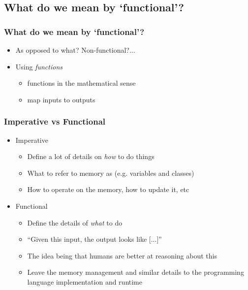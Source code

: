 \documentclass{beamer}
\begin{document}
  \subsection{What do we mean by `functional'?}
  \begin{frame}
    \frametitle{What do we mean by `functional'?}
    \begin{itemize}
      \item As opposed to what? Non-functional?...
      \item Using \textit{functions}
        \begin{itemize}
          \item functions in the mathematical sense
          \item map inputs to outputs
        \end{itemize}
    \end{itemize}
  \end{frame}
  \begin{frame}
    \frametitle{Imperative vs Functional}
    \begin{itemize}
      \item Imperative
        \begin{itemize}
          \item Define a lot of details on \textit{how} to do things
          \item What to refer to memory as (e.g. variables and classes)
          \item How to operate on the memory, how to update it, etc
        \end{itemize}
      \item Functional
        \begin{itemize}
          \item Define the details of \textit{what} to do
          \item ``Given this input, the output looks like [...]''
          \item The idea being that humans are better at reasoning about this
          \item Leave the memory management and similar details to the programming
                language implementation and runtime
        \end{itemize}
    \end{itemize}
  \end{frame}
\end{document}
